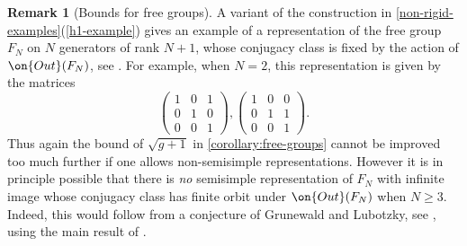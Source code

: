 \documentclass[12 pt]{amsart}
\theoremstyle{plain}
\theoremstyle{definition}
\newtheorem{remark}[subsubsection]{Remark}
\theoremstyle{remark}
\numberwithin{equation}{section}
\begin{document}
\begin{remark}[Bounds for free groups]
	\label{example:free-group-bounds}
	A variant of the construction in \autoref{non-rigid-examples}(\ref{h1-example})
gives an example of a representation of the free group $F_N$ on $N$ generators
of rank $N+1$, whose conjugacy class is fixed by the action of $\on{Out}(F_N)$,
see \cite[p.~1444]{potapchik2000low}. For example, when $N=2$, this representation is given by the matrices $$\begin{pmatrix} 1 & 0 & 1 \\ 0 & 1 & 0 \\ 0 & 0 & 1 \end{pmatrix}, \begin{pmatrix} 1 & 0 & 0 \\ 0 & 1 & 1 \\ 0 & 0 & 1 \end{pmatrix}.$$
Thus again the bound of $\sqrt{g+1}$ in
\autoref{corollary:free-groups} cannot be improved too much further if one
allows non-semisimple representations. However it is in principle possible that
there is \emph{no} semisimple representation of $F_N$ with infinite image whose
conjugacy class has finite orbit under $\on{Out}(F_N)$ when $N\geq 3$. Indeed, this would
follow from a conjecture of Grunewald and Lubotzky, see \cite[\S9.2]{grunewald2009linear}, using the main result of \cite{farb2017moving}.


\end{remark}
\end{document}
